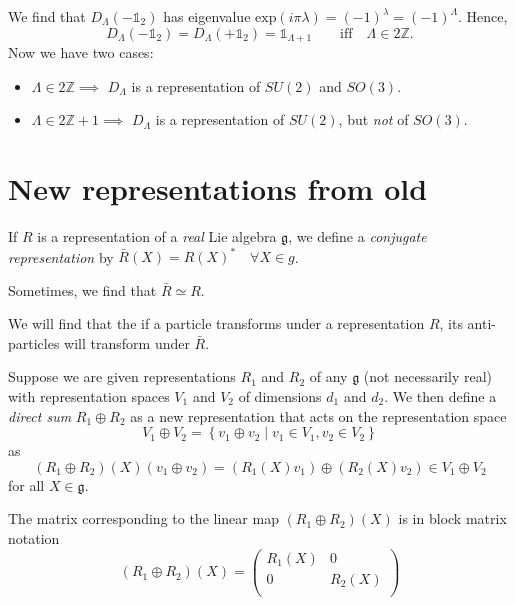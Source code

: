 We find that $D_\Lambda(-\mathbb{1}_2)$ has eigenvalue $\text{exp}(i\pi\lambda) = (-1)^{\lambda} = (-1)^\Lambda$. Hence, 
\begin{equation}
  D_\Lambda (-\mathbb{1}_2) = D_\Lambda (+\mathbb{1}_2) = \mathbb{1}_{\Lambda + 1} \qquad \text{iff} \quad \Lambda \in 2 \mathbb{Z}.
\end{equation}
Now we have two cases:
\begin{itemize}
  \item $\Lambda \in 2\mathbb{Z} \implies$ $D_\Lambda$ is a representation of $SU(2)$ and $SO(3)$.
  \item $\Lambda \in 2\mathbb{Z} + 1 \implies$ $D_\Lambda$ is a representation of $SU(2)$, but \emph{not} of $SO(3)$.
\end{itemize}

\section{New representations from old}%
\label{sec:new_representations_from_old}

\begin{definition}
  If $R$ is a representation of a \emph{real} Lie algebra $\mathfrak{g}$, we define a \emph{conjugate representation} by $\bar R(X) = R(X)^* \quad \forall X \in g$.
\end{definition}
Sometimes, we find that $\bar R \simeq R$.
\begin{leftbar}
  \begin{remark}
    We will find that the if a particle transforms under a representation $R$, its anti-particles will transform under $\bar R$.
  \end{remark}
\end{leftbar}

\begin{definition}
  Suppose we are given representations $R_1$ and $R_2$ of any $\mathfrak{g}$ (not necessarily real) with representation spaces $V_1$ and $V_2$ of dimensions $d_1$ and $d_2$. We then define a \emph{direct sum} $R_1 \oplus R_2$ as a new representation that acts on the representation space
  \begin{equation}
    V_1 \oplus V_2 = \left\{ v_1 \oplus v_2 \mid v_1 \in V_1, v_2 \in V_2 \right\}
  \end{equation}
  as 
  \begin{equation}
    (R_1 \oplus R_2)(X) (v_1 \oplus v_2) = (R_1(X) v_1) \oplus (R_2(X)v_2) \in V_1 \oplus V_2
  \end{equation}
  for all $X \in \mathfrak{g}$.
\end{definition}

The matrix corresponding to the linear map $(R_1 \oplus R_2)(X)$ is in block matrix notation
\begin{equation}
  (R_1 \oplus R_2)(X)= 
  \begin{pmatrix}
    R_1(X) & 0 \\
    0 & R_2(X) \\
  \end{pmatrix}
\end{equation}
